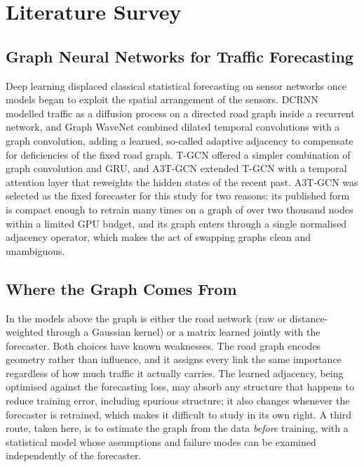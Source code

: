 \documentclass[MTech]{ugthesis}
\begin{document}
\chapter{Literature Survey}

\section{Graph Neural Networks for Traffic Forecasting}
Deep learning displaced classical statistical forecasting on sensor networks once models began to exploit the spatial arrangement of the sensors. DCRNN \citep{li2018dcrnn} modelled traffic as a diffusion process on a directed road graph inside a recurrent network, and Graph WaveNet \citep{wu2019graphwavenet} combined dilated temporal convolutions with a graph convolution, adding a learned, so-called adaptive adjacency to compensate for deficiencies of the fixed road graph. T-GCN \citep{zhao2019tgcn} offered a simpler combination of graph convolution and \ac{GRU}, and A3T-GCN \citep{zhu2020a3tgcn} extended T-GCN with a temporal attention layer that reweights the hidden states of the recent past. A3T-GCN was selected as the fixed forecaster for this study for two reasons: its published form is compact enough to retrain many times on a graph of over two thousand nodes within a limited GPU budget, and its graph enters through a single normalised adjacency operator, which makes the act of swapping graphs clean and unambiguous.

\section{Where the Graph Comes From}
In the models above the graph is either the road network (raw or distance-weighted through a Gaussian kernel) or a matrix learned jointly with the forecaster. Both choices have known weaknesses. The road graph encodes geometry rather than influence, and it assigns every link the same importance regardless of how much traffic it actually carries. The learned adjacency, being optimised against the forecasting loss, may absorb any structure that happens to reduce training error, including spurious structure; it also changes whenever the forecaster is retrained, which makes it difficult to study in its own right. A third route, taken here, is to estimate the graph from the data \emph{before} training, with a statistical model whose assumptions and failure modes can be examined independently of the forecaster.
\end{document}
